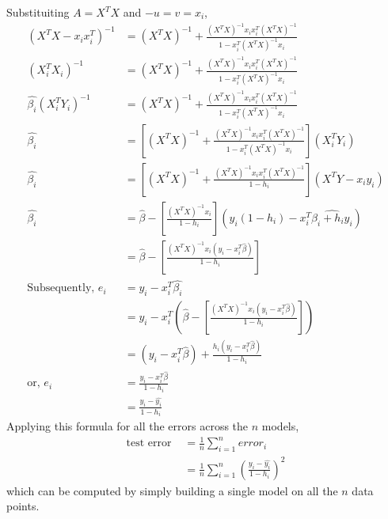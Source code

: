 \documentclass[11pt, a4paper]{article}
\begin{document}
    Substituiting $A = X^{T}X$ and $-u = v = x_{i}$,
    \begin{align*}
        (X^{T}X - x_{i}x_{i}^{T})^{-1} &= (X^{T}X)^{-1} + \frac{(X^{T}X)^{-1}x_{i}x_{i}^{T}(X^{T}X)^{-1}}{1-x_{i}^{T}(X^{T}X)^{-1}x_{i}}\\
        (X_{i}^{T}X_{i})^{-1} &= (X^{T}X)^{-1} + \frac{(X^{T}X)^{-1}x_{i}x_{i}^{T}(X^{T}X)^{-1}}{1-x_{i}^{T}(X^{T}X)^{-1}x_{i}}\\
        \hat{\beta_{i}}(X_{i}^{T}Y_{i})^{-1} &= (X^{T}X)^{-1} + \frac{(X^{T}X)^{-1}x_{i}x_{i}^{T}(X^{T}X)^{-1}}{1-x_{i}^{T}(X^{T}X)^{-1}x_{i}}\\
        \hat{\beta_{i}} &= [(X^{T}X)^{-1} + \frac{(X^{T}X)^{-1}x_{i}x_{i}^{T}(X^{T}X)^{-1}}{1-x_{i}^{T}(X^{T}X)^{-1}x_{i}}](X_{i}^{T}Y_{i})\\
        \hat{\beta_{i}} &= [(X^{T}X)^{-1} + \frac{(X^{T}X)^{-1}x_{i}x_{i}^{T}(X^{T}X)^{-1}}{1-h_{i}}](X^{T}Y - x_{i}y_{i})\\
        \hat{\beta_{i}} &= \hat{\beta} - [\frac{(X^{T}X)^{-1}x_{i}}{1-h_{i}}](y_{i}(1-h_{i})-x_{i}^{T}\hat{\beta_{i}+h_{i}y_{i}})\\
        &= \hat{\beta} - [\frac{(X^{T}X)^{-1}x_{i}(y_{i}-x_{i}^{T}\hat{\beta})}{1-h_{i}}]\\
        \text{Subsequently, } e_{i} &= y_{i} - x_{i}^{T}\hat{\beta_{i}}\\
                                &= y_{i} - x_{i}^{T}(\hat{\beta} - [\frac{(X^{T}X)^{-1}x_{i}(y_{i}-x_{i}^{T}\hat{\beta})}{1-h_{i}}])\\
                                &= (y_{i}-x_{i}^{T}\hat{\beta}) + \frac{h_{i}(y_{i}-x_{i}^{T}\hat{\beta})}{1-h_{i}}\\
            \text{or, } e_{i} &= \frac{y_{i}-x_{i}^{T}\hat{\beta}}{1-h_{i}}\\
                             &= \frac{y_{i}-\hat{y_{i}}}{1-h_{i}}
    \end{align*}
    Applying this formula for all the errors across the $n$ models,
    \begin{align*}
        \text{test error } &= \frac{1}{n}\sum_{i=1}^{n} error_{i}\\
                        &= \frac{1}{n}\sum_{i=1}^{n} (\frac{y_{i}-\hat{y_{i}}}{1-h_{i}})^{2}
    \end{align*}
    which can be computed by simply building a single model on all the $n$ data points.
\end{document}
